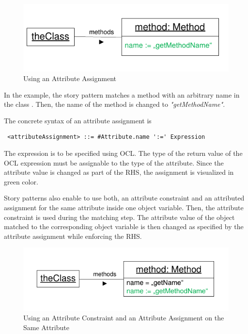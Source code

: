 \begin{figure}[htbp]
  \centering
  \includegraphics[scale=1]{figures/AttributeAssignment}
  \caption{Using an Attribute Assignment}
  \label{fig:attributeAssignment}
\end{figure}

In the example, the story pattern matches a method with an arbitrary name in the class . 
Then, the name of the method is changed to \emph{"getMethodName"}. 

The concrete syntax of an attribute assignment is
\begin{lstlisting}
 <attributeAssignment> ::= #Attribute.name ':=' Expression
\end{lstlisting}
The expression is to be specified using OCL. 
The type of the return value of the OCL expression must be assignable to the type of the attribute. 
Since the attribute value is changed as part of the RHS, the assignment is visualized in green color.

Story patterns also enable to use both, an attribute constraint and an attributed assignment for the same attribute inside one object variable. Then, the attribute constraint is used during the matching step. The attribute value of the object matched to the corresponding object variable is then changed as specified by the attribute assignment while enforcing the RHS.

\begin{figure}[htbp]
  \centering
  \includegraphics[scale=1]{figures/AttributeConstraintAndAssignment}
  \caption{Using an Attribute Constraint and an Attribute Assignment on the Same Attribute}
  \label{fig:attributeConstraintAndAssignment}
\end{figure}

